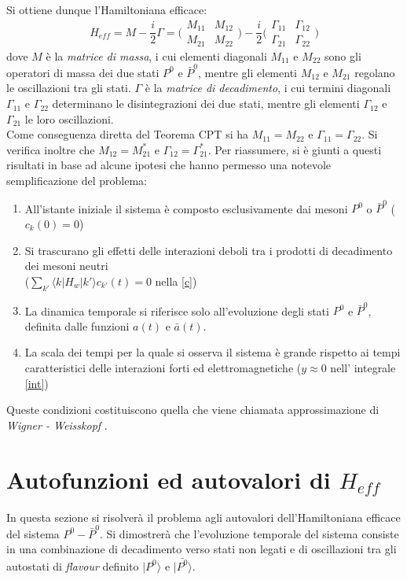 Si ottiene dunque l'Hamiltoniana efficace:
\begin{equation}\label{Heff}
 H_{eff} = M -\frac{i}{2}\Gamma = \Big( \begin{matrix} M_{11} & M_{12} \\ M_{21} & M_{22} \end{matrix}\Big) - \frac{i}{2} \Big( \begin{matrix} \Gamma_{11} & \Gamma_{12} \\ \Gamma_{21} & \Gamma_{22} \end{matrix}\Big)
\end{equation}
dove $M$ \`e la \emph{matrice di massa}, i cui elementi diagonali $M_{11}$ e $M_{22}$ sono gli operatori di massa  dei due stati $P^0$ e $\bar{P}^0$, mentre gli elementi $M_{12}$ e $M_{21}$ regolano le oscillazioni tra gli stati. $\Gamma$ \`e la \emph{matrice di decadimento}, i cui termini diagonali $\Gamma_{11}$ e $\Gamma_{22}$ determinano le disintegrazioni dei due stati, mentre gli elementi $\Gamma_{12}$ e $\Gamma_{21}$ le loro oscillazioni.\\
%
%
Come conseguenza diretta del Teorema CPT si ha $M_{11} = M_{22}$ e $\Gamma_{11} = \Gamma_{22}$.
Si verifica inoltre che $M_{12} = M_{21}^*$ e $\Gamma_{12} = \Gamma_{21}^*$.
%
Per riassumere, si è giunti a questi risultati in base ad alcune ipotesi che hanno permesso una notevole semplificazione del problema:
\begin{enumerate}
 \item All'istante iniziale il sistema \`e composto esclusivamente dai mesoni $P^0$ o $\bar{P}^0$ ($c_k(0) = 0$)
 \item Si trascurano gli effetti delle interazioni deboli tra i prodotti di decadimento dei mesoni neutri\\ 
 ($\sum_{k'} \langle k|H_w|k'\rangle c_{k'} (t) = 0$ nella \eqref{c})
 \item La dinamica temporale si riferisce solo all'evoluzione degli stati  ${P}^0$ e $\bar{P}^0$, definita dalle funzioni $a(t)$ e $\bar{a}(t)$.
 \item La scala dei tempi per la quale si osserva il sistema \`e grande rispetto ai tempi caratteristici delle interazioni forti ed elettromagnetiche ($y\approx0$ nell' integrale \eqref{int})
\end{enumerate}
Queste condizioni costituiscono quella che viene chiamata approssimazione di \emph{Wigner - Weisskopf} \cite{Kabir}.
%
%
\section{Autofunzioni ed autovalori di $H_{eff}$}
\noindent
In questa sezione si risolverà il problema agli autovalori dell'Hamiltoniana efficace del sistema $P^0-\bar{P}^0$.
Si dimostrerà che l'evoluzione temporale del sistema consiste in una combinazione
di decadimento verso stati non legati e di oscillazioni tra gli autostati di \emph{flavour} definito  $|P^0\rangle$ e $|\bar{P^0}\rangle$.

